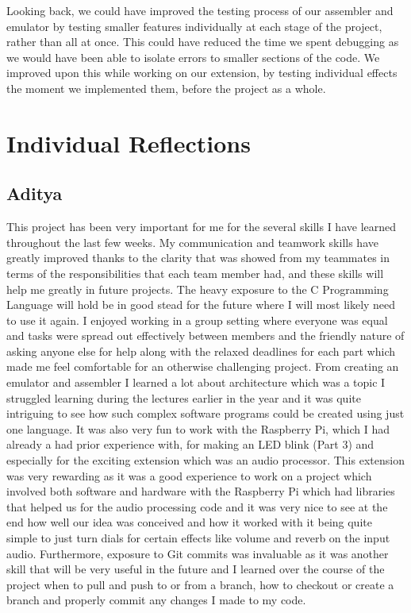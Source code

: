 \documentclass{article}
\begin{document}
Looking back, we could have improved the testing process of our assembler and emulator by testing smaller features individually at each stage of the project, rather than all at once. This could have reduced the time we spent debugging as we would have been able to isolate errors to smaller sections of the code. We improved upon this while working on our extension, by testing individual effects the moment we implemented them, before the project as a whole.

\section{Individual Reflections}

\subsection{Aditya}


This project has been very important for me for the several skills I have learned throughout the last few weeks. My communication and teamwork skills have greatly improved thanks to the clarity that was showed from my teammates in terms of the responsibilities that each team member had, and these skills will help me greatly in future projects. The heavy exposure to the C Programming Language will hold be in good stead for the future where I will most likely need to use it again. I enjoyed working in a group setting where everyone was equal and tasks were spread out effectively between members and the friendly nature of asking anyone else for help along with the relaxed deadlines for each part which made me feel comfortable for an otherwise challenging project. From creating an emulator and assembler I learned a lot about architecture which was a topic I struggled learning during the lectures earlier in the year and it was quite intriguing to see how such complex software programs could be created using just one language. It was also very fun to work with the Raspberry Pi, which I had already a had prior experience with, for making an LED blink (Part 3) and especially for the exciting extension which was an audio processor. This extension was very rewarding as it was a good experience to work on a project which involved both software and hardware with the Raspberry Pi which had libraries that helped us for the audio processing code and it was very nice to see at the end how well our idea was conceived and how it worked with it being quite simple to just turn dials for certain effects like volume and reverb on the input audio. Furthermore, exposure to Git commits was invaluable as it was another skill that will be very useful in the future and I learned over the course of the project when to pull and push to or from a branch, how to checkout or create a branch and properly commit any changes I made to my code. 
\end{document}
